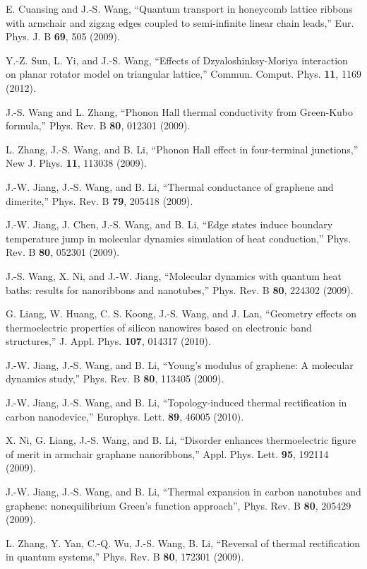 \itm E. Cuansing and J.-S. Wang, ``Quantum transport in honeycomb lattice 
ribbons with armchair and zigzag edges coupled to semi-infinite linear 
chain leads,'' Eur. Phys. J. B {\bf 69}, 505 (2009).

\itm Y.-Z. Sun, L. Yi, and J.-S. Wang, ``Effects of Dzyaloshinksy-Moriya 
interaction on planar rotator model on triangular lattice,'' 
Commun. Comput. Phys. {\bf 11}, 1169 (2012). 

\itm J.-S. Wang and L. Zhang, ``Phonon Hall thermal conductivity from 
Green-Kubo formula,'' Phys. Rev. B {\bf 80}, 012301 (2009).

\itm L. Zhang, J.-S. Wang, and B. Li, ``Phonon Hall effect in four-terminal 
junctions,'' New J. Phys. {\bf 11}, 113038 (2009). 

\itm  J.-W. Jiang, J.-S. Wang, and B. Li, ``Thermal conductance of 
graphene and dimerite,'' Phys. Rev. B {\bf 79}, 205418 (2009).

\itm J.-W. Jiang, J. Chen, J.-S. Wang, and B. Li, ``Edge states induce 
boundary temperature jump in molecular dynamics simulation of heat 
conduction,'' Phys. Rev. B {\bf 80}, 052301 (2009).

\itm J.-S. Wang, X. Ni, and J.-W. Jiang, ``Molecular dynamics with 
quantum heat baths: results for nanoribbons and nanotubes,'' 
Phys. Rev. B {\bf 80}, 224302 (2009).

\itm G. Liang, W. Huang, C. S. Koong, J.-S. Wang, and J. Lan, 
``Geometry effects on thermoelectric properties of silicon nanowires 
based on electronic band structures,'' 
J. Appl. Phys. {\bf 107}, 014317 (2010). 

\itm J.-W. Jiang, J.-S. Wang, and B. Li, ``Young's modulus of graphene: 
A molecular dynamics study,'' Phys. Rev. B {\bf 80}, 113405 (2009).

\itm J.-W. Jiang, J.-S. Wang, and B. Li, 
``Topology-induced thermal rectification in carbon nanodevice,'' 
Europhys. Lett. {\bf 89}, 46005 (2010). 

\itm X. Ni, G. Liang, J.-S. Wang, and B. Li, ``Disorder enhances thermoelectric 
figure of merit in armchair graphane nanoribbons,'' Appl. Phys. Lett.
{\bf 95}, 192114 (2009). 

\itm J.-W. Jiang, J.-S. Wang, and B. Li, ``Thermal expansion in carbon 
nanotubes and graphene: nonequilibrium Green's function approach'', 
Phys. Rev. B {\bf 80}, 205429 (2009). 

\itm L. Zhang, Y. Yan, C.-Q. Wu, J.-S. Wang, B. Li, ``Reversal of thermal 
rectification in quantum systems,'' Phys. Rev. B {\bf 80}, 172301 (2009). 

